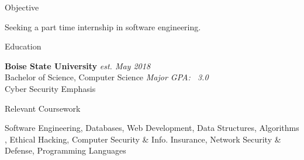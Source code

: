\documentclass{resume}
\begin{document}

\begin{rSection}{Objective}

Seeking a part time internship in software engineering.

\end{rSection}


\begin{rSection}{Education}

{\bf Boise State University} \hfill {\em est. May 2018}\\
Bachelor of Science, Computer Science \hfill {\em Major GPA: ~3.0}\\
Cyber Security Emphasis\\ 
\end{rSection}

\begin{rSection}{Relevant Coursework}

Software Engineering, Databases, Web Development, Data Structures, Algorithms ,
 Ethical Hacking, Computer Security \& Info. Insurance, Network Security \& Defense, Programming Languages

\end{rSection}

\end{document}

